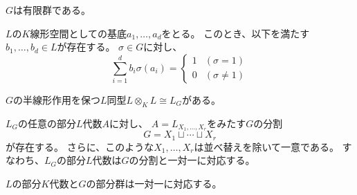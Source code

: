 \begin{lemma}\label{finite}
    $G$は有限群である。
\end{lemma}

\begin{lemma}\label{basis}
    $L$の$K$線形空間としての基底$a_1,\ldots,a_d$をとる。
    このとき、以下を満たす$b_1,\ldots,b_d\in L$が存在する。
    $\sigma\in G$に対し、
    $$
    \sum_{i=1}^db_i\sigma(a_i)=
    \begin{cases}
        1 & (\sigma=1)\\
        0 & (\sigma\neq 1)
    \end{cases}
    $$
\end{lemma}

\begin{proposition}\label{ext-self}
    $G$の半線形作用を保つ$L$同型$L\otimes_KL\cong L_G$がある。
\end{proposition}

\begin{proposition}\label{subalgebra-decomp}
    $L_G$の任意の部分$L$代数$A$に対し、
    $A=L_{X_1,\ldots,X_r}$をみたす$G$の分割$$G=X_1\sqcup \cdots\sqcup X_r$$が存在する。
    さらに、このような$X_1,\ldots,X_r$は並べ替えを除いて一意である。
    すなわち、$L_G$の部分$L$代数は$G$の分割と一対一に対応する。
\end{proposition}

\begin{theorem}\label{main}
    $L$の部分$K$代数と$G$の部分群は一対一に対応する。
\end{theorem}